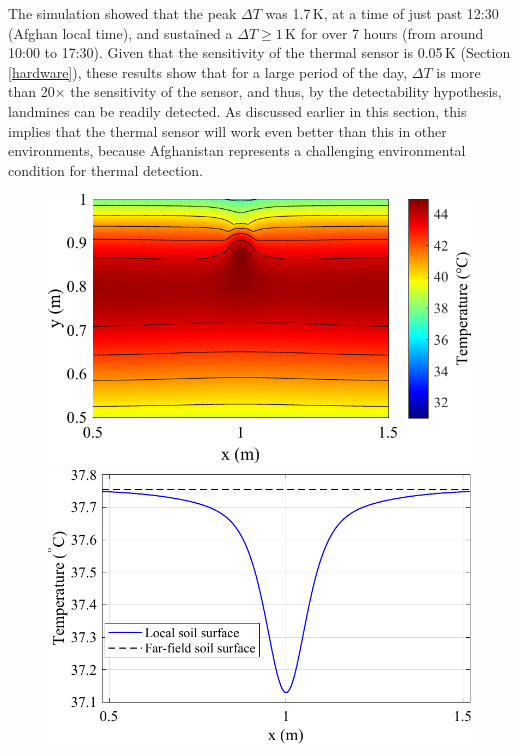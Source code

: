          The simulation showed that the peak \(\Delta T\) was 1.7\,K, at a time of just past 12:30 (Afghan local time), and sustained a \(\Delta T \geq 1\)\,K for over 7 hours (from around 10:00 to 17:30). Given that the sensitivity of the thermal sensor is 0.05\,K (Section \ref{hardware}), these results show that for a large period of the day, \(\Delta T\) is more than 20$\times$ the sensitivity of the sensor, and thus, by the detectability hypothesis, landmines can be readily detected. As discussed earlier in this section, this implies that the thermal sensor will work even better than this in other environments, because Afghanistan represents a challenging environmental condition for thermal detection.
    
        \begin{figure}[htbp]
            \centering
            \begin{minipage}[b]{0.48\textwidth} %
                \includegraphics[width=\textwidth]{figs/Rory/A_temp_distribution.pdf}
            \end{minipage}
            \hfill %
            \begin{minipage}[b]{0.48\textwidth} %
                \includegraphics[width=\textwidth]{figs/Rory/1D_distribution_cropped.pdf}

\end{minipage}
\end{figure}
